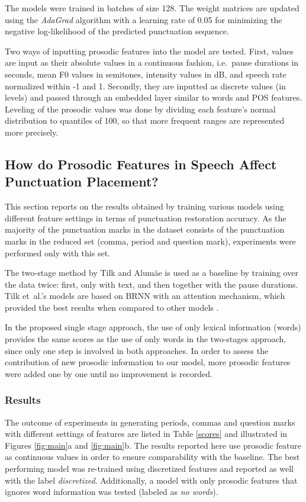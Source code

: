 The models were trained in batches of size 128. The weight matrices are updated using the \textit{AdaGrad} algorithm \citep{adagrad} with a learning rate of 0.05 for minimizing the negative log-likelihood of the predicted punctuation sequence. 

Two ways of inputting prosodic features into the model are tested. First, values are input as their absolute values in a continuous fashion, i.e.~pause durations in seconds, mean F0 values in semitones, intensity values in dB, and speech rate normalized within -1 and 1. Secondly, they are inputted as discrete values (in levels) and passed through an embedded layer similar to words and POS features. Leveling of the prosodic values was done by dividing each feature's normal distribution to quantiles of 100, so that more frequent ranges are represented more precisely. 

\subsection{How do Prosodic Features in Speech Affect Punctuation Placement?}
\label{punkProse:experiments:q1}
This section reports on the results obtained by training various models using different feature settings in terms of punctuation restoration accuracy. As the majority of the punctuation marks in the dataset consists of the punctuation marks in the reduced set (comma, period and question mark), experiments were performed only with this set.

The two-stage method by Tilk and Alumäe is used as a baseline by training over the data twice: first, only with text, and then together with the pause durations. Tilk et~al.'s models are based on BRNN with an attention mechanism, which provided the best results when compared to other models \citep{tilk2016bidirectional}.

In the proposed single stage approach, the use of only lexical information (words) provides the same scores as the use of only words in the two-stages approach, since only one step is involved in both approaches. In order to assess the contribution of new prosodic information to our model, more prosodic features were added one by one until no improvement is recorded. 

\subsubsection{Results}
The outcome of experiments in generating periods, commas and question marks with different settings of features are listed in Table \ref{scores} and illustrated in Figures \ref{fig:main}a and \ref{fig:main}b. The results reported here use prosodic feature as continuous values in order to ensure comparability with the baseline. The best performing model was re-trained using discretized features and reported as well with the label \textit{discretized}. Additionally, a model with only prosodic features that ignores word information was tested (labeled as \textit{no words}). 

